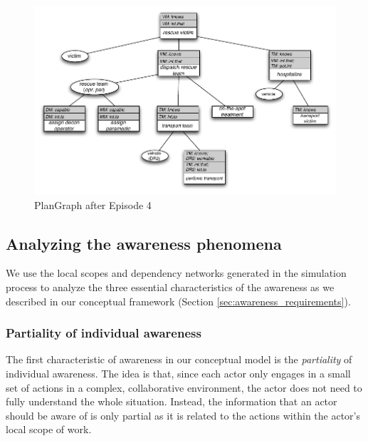 \begin{figure}[htbp] %
	\centering
	\includegraphics{plangraph_ep4.pdf} 
	\caption{PlanGraph after Episode 4}
	\label{fig:plangraph_ep4}
\end{figure}

\subsection{Analyzing the awareness phenomena} %
\label{sub:analyzing_the_awareness_phenomena}
We use the local scopes and dependency networks generated in the simulation process to analyze the three essential characteristics of the awareness as we described in our conceptual framework (Section \ref{sec:awareness_requirements}).  

\subsubsection{Partiality of individual awareness} %
\label{ssub:partiality_of_awareness}
The first characteristic of awareness in our conceptual model is the \emph{partiality} of individual awareness. The idea is that, since each actor only engages in a small set of actions in a complex, collaborative environment, the actor does not need to fully understand the whole situation. Instead, the information that an actor should be aware of is only partial as it is related to the actions within the actor's local scope of work.

